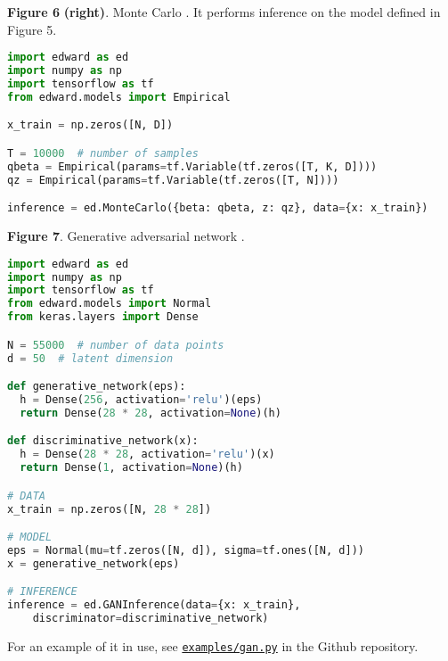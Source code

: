 \textbf{Figure 6} \textbf{(right)}. Monte Carlo \citep{robert1999monte}.
It performs inference on the model defined in Figure 5.
\begin{lstlisting}[language=python]
import edward as ed
import numpy as np
import tensorflow as tf
from edward.models import Empirical

x_train = np.zeros([N, D])

T = 10000  # number of samples
qbeta = Empirical(params=tf.Variable(tf.zeros([T, K, D])))
qz = Empirical(params=tf.Variable(tf.zeros([T, N])))

inference = ed.MonteCarlo({beta: qbeta, z: qz}, data={x: x_train})
\end{lstlisting}

\textbf{Figure 7}. Generative adversarial network
\citep{goodfellow2014generative}.
\begin{lstlisting}[language=python]
import edward as ed
import numpy as np
import tensorflow as tf
from edward.models import Normal
from keras.layers import Dense

N = 55000  # number of data points
d = 50  # latent dimension

def generative_network(eps):
  h = Dense(256, activation='relu')(eps)
  return Dense(28 * 28, activation=None)(h)

def discriminative_network(x):
  h = Dense(28 * 28, activation='relu')(x)
  return Dense(1, activation=None)(h)

# DATA
x_train = np.zeros([N, 28 * 28])

# MODEL
eps = Normal(mu=tf.zeros([N, d]), sigma=tf.ones([N, d]))
x = generative_network(eps)

# INFERENCE
inference = ed.GANInference(data={x: x_train},
    discriminator=discriminative_network)
\end{lstlisting}
For an example of it in use, see
\href{https://github.com/blei-lab/edward/blob/master/examples/gan.py}{\texttt{examples/gan.py}}
in the Github repository.

